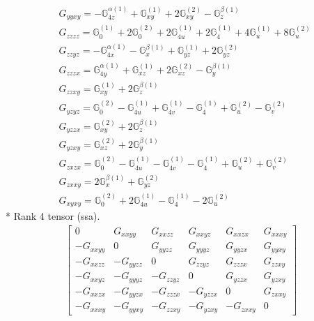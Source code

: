 \documentclass[fleqn,8pt,landscape]{jsarticle}
\begin{document}
\begin{align*}
& G_{yyxy} = - \mathbb{G}_{4z}^{\alpha(1)} + \mathbb{G}_{xy}^{(1)} + 2 \mathbb{G}_{xy}^{(2)} - \mathbb{G}_{z}^{\beta(1)} \\
& G_{zzzz} = \mathbb{G}_{0}^{(1)} + 2 \mathbb{G}_{0}^{(2)} + 2 \mathbb{G}_{4u}^{(1)} + 2 \mathbb{G}_{4}^{(1)} + 4 \mathbb{G}_{u}^{(1)} + 8 \mathbb{G}_{u}^{(2)} \\
& G_{zzyz} = - \mathbb{G}_{4x}^{\alpha(1)} - \mathbb{G}_{x}^{\beta(1)} + \mathbb{G}_{yz}^{(1)} + 2 \mathbb{G}_{yz}^{(2)} \\
& G_{zzzx} = \mathbb{G}_{4y}^{\alpha(1)} + \mathbb{G}_{xz}^{(1)} + 2 \mathbb{G}_{xz}^{(2)} - \mathbb{G}_{y}^{\beta(1)} \\
& G_{zzxy} = \mathbb{G}_{xy}^{(1)} + 2 \mathbb{G}_{z}^{\beta(1)} \\
& G_{yzyz} = \mathbb{G}_{0}^{(2)} - \mathbb{G}_{4u}^{(1)} + \mathbb{G}_{4v}^{(1)} - \mathbb{G}_{4}^{(1)} + \mathbb{G}_{u}^{(2)} - \mathbb{G}_{v}^{(2)} \\
& G_{yzzx} = \mathbb{G}_{xy}^{(2)} + 2 \mathbb{G}_{z}^{\beta(1)} \\
& G_{yzxy} = \mathbb{G}_{xz}^{(2)} + 2 \mathbb{G}_{y}^{\beta(1)} \\
& G_{zxzx} = \mathbb{G}_{0}^{(2)} - \mathbb{G}_{4u}^{(1)} - \mathbb{G}_{4v}^{(1)} - \mathbb{G}_{4}^{(1)} + \mathbb{G}_{u}^{(2)} + \mathbb{G}_{v}^{(2)} \\
& G_{zxxy} = 2 \mathbb{G}_{x}^{\beta(1)} + \mathbb{G}_{yz}^{(2)} \\
& G_{xyxy} = \mathbb{G}_{0}^{(2)} + 2 \mathbb{G}_{4u}^{(1)} - \mathbb{G}_{4}^{(1)} - 2 \mathbb{G}_{u}^{(2)}
\end{align*}
* Rank 4 tensor (ssa).
\begin{align*}
\begin{bmatrix} 0 & G_{xxyy} & G_{xxzz} & G_{xxyz} & G_{xxzx} & G_{xxxy} \\ - G_{xxyy} & 0 & G_{yyzz} & G_{yyyz} & G_{yyzx} & G_{yyxy} \\ - G_{xxzz} & - G_{yyzz} & 0 & G_{zzyz} & G_{zzzx} & G_{zzxy} \\ - G_{xxyz} & - G_{yyyz} & - G_{zzyz} & 0 & G_{yzzx} & G_{yzxy} \\ - G_{xxzx} & - G_{yyzx} & - G_{zzzx} & - G_{yzzx} & 0 & G_{zxxy} \\ - G_{xxxy} & - G_{yyxy} & - G_{zzxy} & - G_{yzxy} & - G_{zxxy} & 0 \end{bmatrix}
\end{align*}
\end{document}
